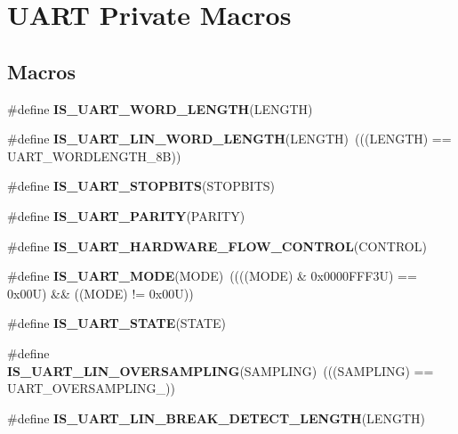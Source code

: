 \hypertarget{group___u_a_r_t___private___macros}{}\section{U\+A\+RT Private Macros}
\label{group___u_a_r_t___private___macros}
\subsection*{Macros}
\begin{DoxyCompactItemize}
\item 
\#define {\bfseries I\+S\+\_\+\+U\+A\+R\+T\+\_\+\+W\+O\+R\+D\+\_\+\+L\+E\+N\+G\+TH}(L\+E\+N\+G\+TH)
\item 
\mbox{\label{group___u_a_r_t___private___macros_ga12e732e82119829947fb0c97da82bd69}} 
\#define {\bfseries I\+S\+\_\+\+U\+A\+R\+T\+\_\+\+L\+I\+N\+\_\+\+W\+O\+R\+D\+\_\+\+L\+E\+N\+G\+TH}(L\+E\+N\+G\+TH)~(((L\+E\+N\+G\+TH) == U\+A\+R\+T\+\_\+\+W\+O\+R\+D\+L\+E\+N\+G\+T\+H\+\_\+8B))
\item 
\#define {\bfseries I\+S\+\_\+\+U\+A\+R\+T\+\_\+\+S\+T\+O\+P\+B\+I\+TS}(S\+T\+O\+P\+B\+I\+TS)
\item 
\#define {\bfseries I\+S\+\_\+\+U\+A\+R\+T\+\_\+\+P\+A\+R\+I\+TY}(P\+A\+R\+I\+TY)
\item 
\#define {\bfseries I\+S\+\_\+\+U\+A\+R\+T\+\_\+\+H\+A\+R\+D\+W\+A\+R\+E\+\_\+\+F\+L\+O\+W\+\_\+\+C\+O\+N\+T\+R\+OL}(C\+O\+N\+T\+R\+OL)
\item 
\mbox{\label{group___u_a_r_t___private___macros_ga748d45fbdc96c743bee170b749f961ba}} 
\#define {\bfseries I\+S\+\_\+\+U\+A\+R\+T\+\_\+\+M\+O\+DE}(M\+O\+DE)~((((M\+O\+DE) \& 0x0000\+F\+F\+F3\+U) == 0x00\+U) \&\& ((\+M\+O\+D\+E) != 0x00\+U))
\item 
\#define {\bfseries I\+S\+\_\+\+U\+A\+R\+T\+\_\+\+S\+T\+A\+TE}(S\+T\+A\+TE)
\item 
\mbox{\label{group___u_a_r_t___private___macros_gacd5577cca731f8ef51badd665f6aa5e6}} 
\#define {\bfseries I\+S\+\_\+\+U\+A\+R\+T\+\_\+\+L\+I\+N\+\_\+\+O\+V\+E\+R\+S\+A\+M\+P\+L\+I\+NG}(S\+A\+M\+P\+L\+I\+NG)~(((S\+A\+M\+P\+L\+I\+NG) == U\+A\+R\+T\+\_\+\+O\+V\+E\+R\+S\+A\+M\+P\+L\+I\+N\+G\+\_))
\item 
\#define {\bfseries I\+S\+\_\+\+U\+A\+R\+T\+\_\+\+L\+I\+N\+\_\+\+B\+R\+E\+A\+K\+\_\+\+D\+E\+T\+E\+C\+T\+\_\+\+L\+E\+N\+G\+TH}(L\+E\+N\+G\+TH)

\end{DoxyCompactItemize}
